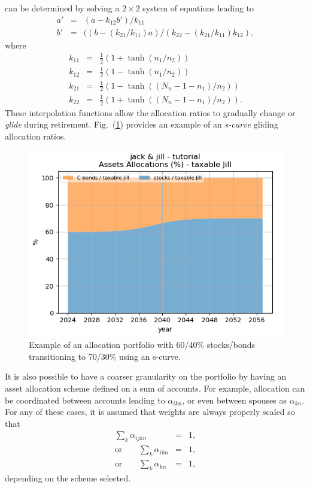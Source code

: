 \documentclass{report}[fleqn,12pt]
\begin{document}
\begin{description}[leftmargin=4em,style=multiline]
	can be determined by solving a $2\times 2$ system of equations leading to
	\begin{eqnarray}
		a' &=& (a - k_{12}b')/k_{11} \nonumber \\
		b' &=& ((b - (k_{21}/k_{11})a)/(k_{22} - (k_{21}/k_{11})k_{12}),
	\end{eqnarray}
	where
	\begin{eqnarray}
		k_{11} &=& \frac{1}{2}(1 + \tanh(n_1/n_2)) \nonumber \\
		k_{12} &=& \frac{1}{2}(1 - \tanh(n_1/n_2)) \nonumber \\
		k_{21} &=& \frac{1}{2}(1 - \tanh((N_n-1-n_1)/n_2)) \nonumber \\
		k_{22} &=& \frac{1}{2}(1 + \tanh((N_n-1-n_1)/n_2)).
	\end{eqnarray}
	These interpolation functions allow the allocation ratios to gradually change
	or {\em glide} during retirement. Fig.~(\ref{Fig:allocations}) provides an example
	of an {\em s-curve} gliding allocation ratios.

	\begin{figure}[t]
	\includegraphics{allocations.png}
		\caption{\small Example of an allocation portfolio with 60/40\% stocks/bonds 
		transitioning to 70/30\% using an s-curve. \label{Fig:allocations}}
	\end{figure}
	It is also possible to have a coarser granularity on the portfolio by
	having an asset allocation scheme
	defined on a sum of accounts. For example, allocation can be coordinated between accounts
	leading to $\alpha_{ikn}$, or even between spouses as $\alpha_{kn}$.
	For any of these cases, it is assumed that weights are always properly scaled so that
	\begin{eqnarray}
		\sum_{k} \alpha_{ijkn} &=& 1, \nonumber\\
		\text{or} \qquad \sum_{k} \alpha_{ikn} &=& 1, \nonumber\\
		\text{or} \qquad \sum_{k} \alpha_{kn} &=& 1,
	\end{eqnarray}
	depending on the scheme selected.


\end{description}
\end{document}
